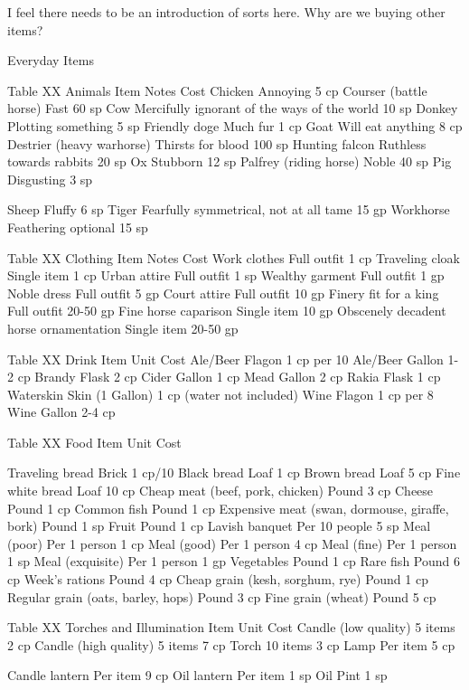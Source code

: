 \documentclass[oneside,11pt,english]{book}
\begin{document}
 

I feel there needs to be an introduction of sorts here. Why are we buying other items? 

 

Everyday Items 

 
Table XX Animals 
Item Notes Cost 
Chicken Annoying 5 cp 
Courser (battle horse) Fast 60 sp 
Cow Mercifully ignorant of the ways of the world 10 sp 
Donkey Plotting something 5 sp 
Friendly doge Much fur 1 cp 
Goat Will eat anything 8 cp 
Destrier (heavy warhorse) Thirsts for blood 100 sp 
Hunting falcon Ruthless towards rabbits 20 sp 
Ox Stubborn 12 sp 
Palfrey (riding horse) Noble 40 sp 
Pig Disgusting 3 sp 


Sheep Fluffy 6 sp 
Tiger Fearfully symmetrical, not at all tame 15 gp 
Workhorse Feathering optional 15 sp 

 
Table XX Clothing 
Item Notes Cost 
Work clothes Full outfit 1 cp 
Traveling cloak Single item 1 cp 
Urban attire Full outfit 1 sp 
Wealthy garment Full outfit 1 gp 
Noble dress Full outfit 5 gp 
Court attire Full outfit 10 gp 
Finery fit for a king Full outfit 20-50 gp 
Fine horse caparison Single item 10 gp 
Obscenely decadent horse ornamentation Single item 20-50 gp 

 
Table XX Drink 
Item Unit Cost 
Ale/Beer Flagon 1 cp per 10 
Ale/Beer Gallon 1-2 cp 
Brandy Flask 2 cp 
Cider Gallon 1 cp 
Mead Gallon 2 cp 
Rakia Flask 1 cp 
Waterskin Skin (1 Gallon) 1 cp (water not included) 
Wine Flagon 1 cp per 8 
Wine Gallon 2-4 cp 

 
Table XX Food 
Item Unit Cost 


Traveling bread Brick 1 cp/10 
Black bread Loaf 1 cp 
Brown bread Loaf 5 cp 
Fine white bread Loaf 10 cp 
Cheap meat (beef, pork, chicken) Pound 3 cp 
Cheese Pound 1 cp 
Common fish Pound 1 cp 
Expensive meat (swan, dormouse, giraffe, bork) Pound 1 sp 
Fruit Pound 1 cp 
Lavish banquet Per 10 people 5 sp 
Meal (poor) Per 1 person 1 cp 
Meal (good) Per 1 person 4 cp 
Meal (fine) Per 1 person 1 sp 
Meal (exquisite) Per 1 person 1 gp 
Vegetables Pound 1 cp 
Rare fish Pound 6 cp 
Week's rations Pound 4 cp 
Cheap grain (kesh, sorghum, rye) Pound 1 cp 
Regular grain (oats, barley, hops) Pound 3 cp 
Fine grain (wheat) Pound 5 cp 

 
Table XX Torches and Illumination 
Item Unit Cost 
Candle (low quality) 5 items 2 cp 
Candle (high quality) 5 items 7 cp 
Torch 10 items 3 cp 
Lamp Per item 5 cp 


Candle lantern Per item 9 cp 
Oil lantern Per item 1 sp 
Oil Pint 1 sp 
\end{document}
